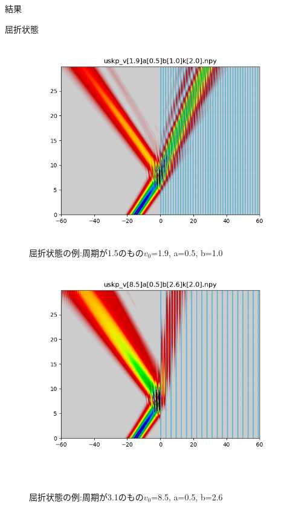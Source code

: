 \documentclass[a4paper, lualatex]{bxjsarticle}
\begin{document}
\begin{section}{結果}
    \begin{subsection}{屈折状態}
        \begin{figure}[h]
            \begin{minipage}{0.5\hsize}
                \centering
                \includegraphics[width=0.9\hsize]{kussetsu1.png}
                \caption{屈折状態の例:周期が1.5のもの$v_0$=1.9, a=0.5, b=1.0}
            \end{minipage}
            \begin{minipage}{0.5\hsize}
                \centering
                \includegraphics[width=0.9\hsize]{kussetsu2.png}
                \caption{屈折状態の例:周期が3.1のもの$v_0$=8.5, a=0.5, b=2.6}
            \end{minipage}\\
            \begin{minipage}{0.5\hsize}
                \centering

\end{minipage}
\end{figure}
\end{subsection}
\end{section}
\end{document}
